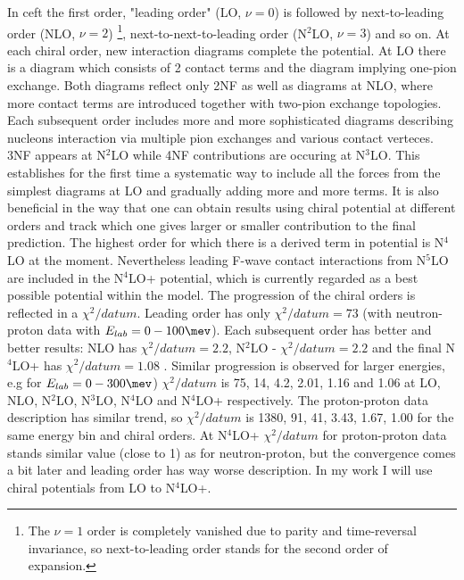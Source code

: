 In \gls{ceft} the first order, "leading order" (LO, $\nu=0$) is followed 
by next-to-leading order (NLO, $\nu=2$)
\footnote{The $\nu=1$ order is completely vanished due to parity and time-reversal invariance,
so next-to-leading order stands for the second order of expansion.},
 next-to-next-to-leading order (N$^2$LO, $\nu=3$) and so on.
 At each chiral order, new interaction diagrams complete the potential.
 At LO there is a diagram which consists of 2 contact terms and the diagram
 implying one-pion exchange. Both diagrams reflect only 2NF as well
 as diagrams at NLO, where more contact terms are introduced together with two-pion 
 exchange topologies. Each subsequent order includes more and more sophisticated diagrams
 describing nucleons interaction
 via multiple  pion exchanges and various contact verteces.
 3NF appears at N$^2$LO while 4NF contributions are occuring at N$^3$LO.
 This establishes for the first time a systematic
way to include all the forces from the simplest diagrams at LO and gradually
adding more and more terms. 
It is also beneficial in the way that 
one can obtain results using chiral potential at different
orders and track which one gives larger or smaller contribution to the final prediction.
The highest order for which there is a derived term in potential
is N$^4$LO at the moment. Nevertheless leading F-wave contact interactions from N$^5$LO are included in the N$^4$LO+ potential,
which is currently regarded as a best possible potential within the model.
The progression of the chiral orders is reflected in a $\chi^2/datum$.
Leading order has only $\chi^2/datum = 73$ (with neutron-proton data with $E_{lab} = 0-100 \unit{\mev}$).
Each subsequent order has better and better results: NLO has $\chi^2/datum = 2.2$, N$^2$LO - $\chi^2/datum = 2.2$
and the final N$^4$LO+ has $\chi^2/datum = 1.08$ \cite{reinkrebs2018}.
Similar progression is observed for larger energies, e.g for $E_{lab} = 0-300 \unit{\mev}$)
$\chi^2/datum$ is 75, 14, 4.2, 2.01, 1.16 and 1.06 at LO, NLO, N$^2$LO, N$^3$LO, N$^4$LO and N$^4$LO+ respectively.
The proton-proton data description has similar trend, so $\chi^2/datum$ is 1380, 91, 41, 3.43, 1.67, 1.00 
for the same energy bin and chiral orders. At N$^4$LO+ $\chi^2/datum$ for proton-proton data
stands similar value (close to 1) as for neutron-proton, but the convergence comes a bit later and 
leading order has way worse description.
In my work I will use chiral potentials from LO to N$^4$LO+.

